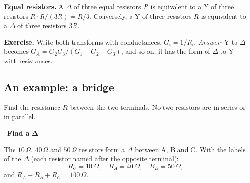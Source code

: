 \documentclass[11pt,a4paper]{article}
\newif\ifsolfirst
\newcommand{\solution}{\par\smallskip\noindent{\color{cpow}\bfseries Solution}\par\nobreak\smallskip\global\solfirsttrue}
\newcommand{\solstep}[2]{\par\ifsolfirst\global\solfirstfalse\else\medskip\needspace{5\baselineskip}\fi
  \noindent{\color{cpow}\bfseries Step #1.}\ {\bfseries #2}\par\nobreak\smallskip}
\newcommand{\ohm}{\,\Omega}
\newcommand{\SD}{R_A + R_B + R_C}
\newcommand{\Dltq}{%
  \draw (0,0) to[R] (3,0) to[R] (1.5,2.5) to[R] (0,0);
  \node[font=\small] at (1.5,-0.45) {$R$};
  \node[font=\small] at (2.8,1.6) {$R$};
  \node[font=\small] at (0.2,1.6) {$R$};
  \foreach \p in {(0,0),(3,0),(1.5,2.5)} \draw \p node[ocirc] {};}
\newcommand{\Wyeq}[1]{%
  \draw (0,0) to[R] (1.5,0.95); \draw (3,0) to[R] (1.5,0.95);
  \draw (1.5,2.5) to[R] (1.5,0.95);
  \fill (1.5,0.95) circle (1.6pt);
  \node[font=\small] at (0.5,1.0) {$#1$};
  \node[font=\small] at (2.5,1.0) {$#1$};
  \node[font=\small] at (2.0,1.8) {$#1$};
  \foreach \p in {(0,0),(3,0),(1.5,2.5)} \draw \p node[ocirc] {};}
\newcommand{\exBr}[1]{%
  \ifnum#1<2
    \draw (-1.3,4.0) -- (2,4.0) -- (2,3.4); \draw (-1.3,0) -- (2,0);
    \draw (-1.3,4.0) node[ocirc] {}; \draw (-1.3,0) node[ocirc] {};
    \draw (2,3.4) to[R] (0,1.7) to[R] (2,0);
    \draw (2,3.4) to[R] (4,1.7) to[R] (2,0);
    \draw (0,1.7) to[R] (4,1.7);
    \foreach \p in {(2,3.4),(0,1.7),(4,1.7),(2,0)} \fill \p circle (1.7pt);
    \node[font=\small] at (0.4,3.05) {$7\ohm$};
    \node[font=\small] at (3.6,3.05) {$20\ohm$};
    \node[font=\small] at (2,2.15) {$10\ohm$};
    \node[font=\small] at (0.4,0.3) {$50\ohm$};
    \node[font=\small] at (3.6,0.3) {$40\ohm$};
    \ifnum#1=1
      \draw[sdel] (0,1.7) -- (4,1.7) -- (2,0) -- cycle;
      \node[tlab, left] at (-0.1,1.7) {A}; \node[tlab, right] at (4.1,1.7) {B};
      \node[tlab, below right] at (2.05,-0.05) {C};
    \fi
  \else
    \draw (-1.3,4.0) -- (2,4.0) -- (2,3.4); \draw (-1.3,-0.6) -- (2,-0.6);
    \draw (-1.3,4.0) node[ocirc] {}; \draw (-1.3,-0.6) node[ocirc] {};
    \draw (2,3.4) to[R] (0,2.0) to[R] (2,0.9);
    \draw (2,3.4) to[R] (4,2.0) to[R] (2,0.9);
    \draw (2,0.9) to[R] (2,-0.6);
    \draw[swye] (0,2.0) -- (2,0.9) -- (4,2.0); \draw[swye] (2,0.9) -- (2,-0.6);
    \foreach \p in {(2,3.4),(0,2.0),(4,2.0),(2,0.9),(2,-0.6)} \fill \p circle (1.7pt);
    \node[font=\small] at (0.45,3.15) {$7\ohm$};
    \node[font=\small] at (3.6,3.15) {$20\ohm$};
    \node[font=\small, text=ccur] at (0.65,0.9) {$5\ohm$};
    \node[font=\small, text=ccur] at (3.35,0.9) {$4\ohm$};
    \node[font=\small, text=ccur] at (2.7,0.15) {$20\ohm$};
    \node[tlab, left] at (-0.1,2.0) {A}; \node[tlab, right] at (4.1,2.0) {B};
    \node[tlab, below right] at (2.05,-0.65) {C};
  \fi}
\begin{document}
\begin{minipage}[c]{0.56\linewidth}
\textbf{Equal resistors.} A $\Delta$ of three equal resistors $R$ is equivalent to a Y of three
resistors $R \cdot R/(3R) = R/3$. Conversely, a Y of three resistors $R$ is equivalent to a
$\Delta$ of three resistors $3R$.

\smallskip
\textbf{Exercise.} Write both transforms with conductances, $G_\square = 1/R_\square$.
\emph{Answer:} Y to $\Delta$ becomes $G_A = G_2G_3/(G_1 + G_2 + G_3)$, and so on; it has the
form of $\Delta$ to Y with resistances.
\end{minipage}\hfill
\begin{minipage}[c]{0.4\linewidth}
\centering
{}
\end{minipage}

\subsection*{An example: a bridge}

\bigskip
\begin{examplebox}
\begin{minipage}[c]{0.5\linewidth}
\centering
{}
\end{minipage}\hfill
\begin{minipage}[c]{0.46\linewidth}
Find the resistance $R$ between the two terminals. No two resistors are in series or in
parallel.
\end{minipage}
\end{examplebox}

\solution

\solstep{1}{Find a $\boldsymbol{\Delta}$}
\begin{minipage}[c]{0.5\linewidth}
\centering
{}
\end{minipage}\hfill
\begin{minipage}[c]{0.46\linewidth}
The $10\ohm$, $40\ohm$ and $50\ohm$ resistors form a $\Delta$ between A, B and C. With the
labels of the $\Delta$ (each resistor named after the opposite terminal):
\[
  R_C = 10\ohm, \quad R_A = 40\ohm, \quad R_B = 50\ohm,
\]
and $\SD = 100\ohm$.
\end{minipage}
\end{document}
